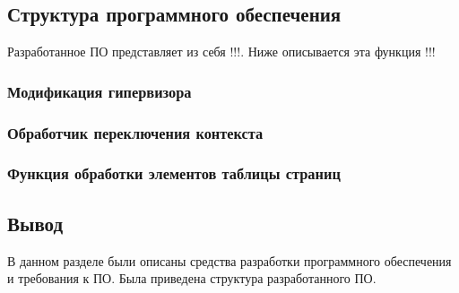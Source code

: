 \subsection{Структура программного обеспечения}

Разработанное ПО представляет из себя !!!. Ниже описывается эта функция  !!!

\subsubsection{Модификация гипервизора}

\subsubsection{Обработчик переключения контекста}

\subsubsection{Функция обработки элементов таблицы страниц}

\subsection{Вывод}

В данном разделе были описаны средства разработки программного обеспечения и требования к ПО. Была приведена структура разработанного ПО.

\pagebreak

